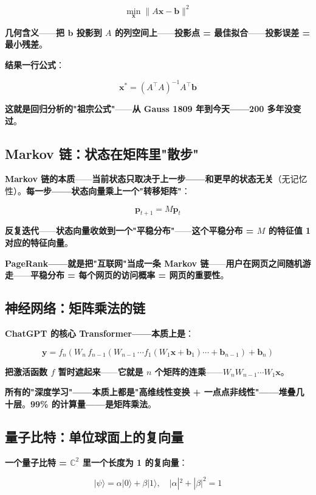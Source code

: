 \[
\min_{\bm{x}} \|A \bm{x} - \bm{b}\|^2
\]

\textbf{几何含义}——\textbf{把 $\bm{b}$ 投影到 $A$ 的列空间上}——\textbf{投影点 = 最佳拟合}——\textbf{投影误差 = 最小残差}。

\textbf{结果一行公式}：

\[
\bm{x}^* = (A^{\!\top} A)^{-1} A^{\!\top} \bm{b}
\]

\textbf{这就是回归分析的"祖宗公式"}——\textbf{从 Gauss 1809 年到今天——200 多年没变过}。

\subsection{Markov 链：状态在矩阵里"散步"}

\textbf{Markov 链的本质}——\textbf{当前状态只取决于上一步——和更早的状态无关}（无记忆性）。\textbf{每一步——状态向量乘上一个"转移矩阵"}：

\[
\bm{p}_{t+1} = M \bm{p}_t
\]

\textbf{反复迭代}——\textbf{状态向量收敛到一个"平稳分布"}——\textbf{这个平稳分布 = $M$ 的特征值 1 对应的特征向量}。

\textbf{PageRank——就是把"互联网"当成一条 Markov 链}——\textbf{用户在网页之间随机游走}——\textbf{平稳分布 = 每个网页的访问概率 = 网页的重要性}。

\subsection{神经网络：矩阵乘法的链}

\textbf{ChatGPT 的核心 Transformer——本质上是}：

\[
\bm{y} = f_n(W_n \, f_{n-1}(W_{n-1} \, \cdots f_1(W_1 \bm{x} + \bm{b}_1) \cdots + \bm{b}_{n-1}) + \bm{b}_n)
\]

\textbf{把激活函数 $f$ 暂时遮起来}——\textbf{它就是 $n$ 个矩阵的连乘}——\textbf{$W_n W_{n-1} \cdots W_1 \bm{x}$}。

\textbf{所有的"深度学习"——本质上都是"高维线性变换 + 一点点非线性"——堆叠几十层}。\textbf{99\% 的计算量——是矩阵乘法}。

\subsection{量子比特：单位球面上的复向量}

\textbf{一个量子比特 = $\mathbb{C}^2$ 里一个长度为 1 的复向量}：

\[
|\psi\rangle = \alpha |0\rangle + \beta |1\rangle, \quad |\alpha|^2 + |\beta|^2 = 1
\]

